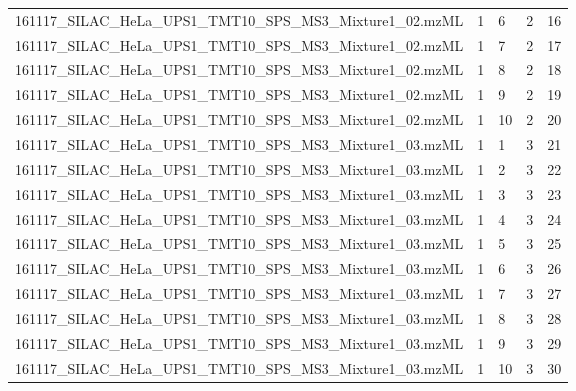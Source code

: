 \begin{table}[ht]
\begin{tabular*}{0.90\textwidth}{lllll}
161117\_SILAC\_HeLa\_UPS1\_TMT10\_SPS\_MS3\_Mixture1\_02.mzML & 1        & 6     & 2               & 16     \\
161117\_SILAC\_HeLa\_UPS1\_TMT10\_SPS\_MS3\_Mixture1\_02.mzML & 1        & 7     & 2               & 17     \\
161117\_SILAC\_HeLa\_UPS1\_TMT10\_SPS\_MS3\_Mixture1\_02.mzML & 1        & 8     & 2               & 18     \\
161117\_SILAC\_HeLa\_UPS1\_TMT10\_SPS\_MS3\_Mixture1\_02.mzML & 1        & 9     & 2               & 19     \\
161117\_SILAC\_HeLa\_UPS1\_TMT10\_SPS\_MS3\_Mixture1\_02.mzML & 1        & 10   & 2               & 20     \\
161117\_SILAC\_HeLa\_UPS1\_TMT10\_SPS\_MS3\_Mixture1\_03.mzML & 1        & 1     & 3               & 21     \\
161117\_SILAC\_HeLa\_UPS1\_TMT10\_SPS\_MS3\_Mixture1\_03.mzML & 1        & 2     & 3               & 22     \\
161117\_SILAC\_HeLa\_UPS1\_TMT10\_SPS\_MS3\_Mixture1\_03.mzML & 1        & 3     & 3               & 23     \\
161117\_SILAC\_HeLa\_UPS1\_TMT10\_SPS\_MS3\_Mixture1\_03.mzML & 1        & 4     & 3               & 24     \\
161117\_SILAC\_HeLa\_UPS1\_TMT10\_SPS\_MS3\_Mixture1\_03.mzML & 1        & 5     & 3               & 25     \\
161117\_SILAC\_HeLa\_UPS1\_TMT10\_SPS\_MS3\_Mixture1\_03.mzML & 1        & 6     & 3               & 26     \\
161117\_SILAC\_HeLa\_UPS1\_TMT10\_SPS\_MS3\_Mixture1\_03.mzML & 1        & 7     & 3               & 27     \\
161117\_SILAC\_HeLa\_UPS1\_TMT10\_SPS\_MS3\_Mixture1\_03.mzML & 1        & 8     & 3               & 28     \\
161117\_SILAC\_HeLa\_UPS1\_TMT10\_SPS\_MS3\_Mixture1\_03.mzML & 1        & 9     & 3               & 29     \\
161117\_SILAC\_HeLa\_UPS1\_TMT10\_SPS\_MS3\_Mixture1\_03.mzML & 1        & 10   & 3               & 30    
\end{tabular*}
\end{table}
  
